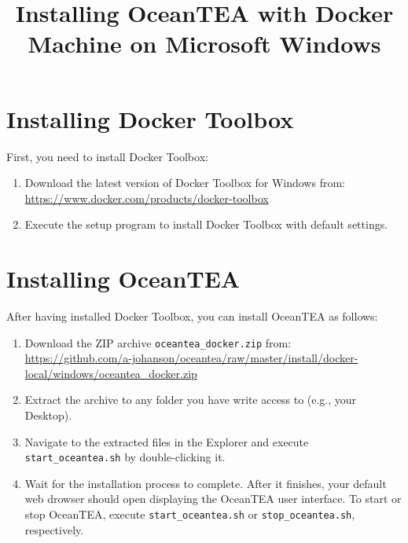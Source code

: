 \documentclass[11pt,a4paper,english,oneside,parskip=false]{scrartcl} %
\begin{document}
\title{Installing OceanTEA with Docker Machine on Microsoft Windows}
\date{}

\maketitle

\section{Installing Docker Toolbox} \label{sec:docker}

First, you need to install Docker Toolbox: 
\begin{enumerate}
	\item Download the latest version of Docker Toolbox for Windows from:\\ \url{https://www.docker.com/products/docker-toolbox}
	\item Execute the setup program to install Docker Toolbox with default settings. 
\end{enumerate}


\section{Installing OceanTEA} \label{sec:oceantea}

After having installed Docker Toolbox, you can install OceanTEA as follows:
\begin{enumerate}
	\item Download the ZIP archive \texttt{oceantea\_docker.zip} from:\\
	\url{https://github.com/a-johanson/oceantea/raw/master/install/docker-local/windows/oceantea_docker.zip}
	\item Extract the archive to any folder you have write access to (e.g., your Desktop).
	\item Navigate to the extracted files in the Explorer and execute \texttt{start\_oceantea.sh} by double\hyp{}clicking it.
	\item Wait for the installation process to complete. After it finishes, your default web drowser should open displaying the OceanTEA user interface. 
	To start or stop OceanTEA, execute \texttt{start\_oceantea.sh} or \texttt{stop\_oceantea.sh}, respectively.
\end{enumerate}
\end{document}
